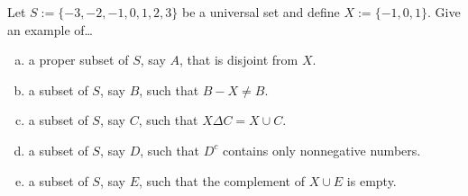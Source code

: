 \documentclass[11pt,letterpaper]{article}
\begin{document}

 Let $S:= \{ -3, -2, -1, 0, 1, 2, 3 \}$ be a universal set and define $X:= \{ -1, 0, 1 \}$. Give an example of\dots
	\begin{enumerate}[(a)]
	\item a proper subset of $S$, say $A$, that is disjoint from $X$.
	\item a subset of $S$, say $B$, such that $B - X \neq B$.
	\item a subset of $S$, say $C$, such that $X \Delta C= X \cup C$.
	\item a subset of $S$, say $D$, such that $D^c$ contains only nonnegative numbers.
	\item a subset of $S$, say $E$, such that the complement of $X \cup E$ is empty. 
	\end{enumerate} \pspace
\end{document}
